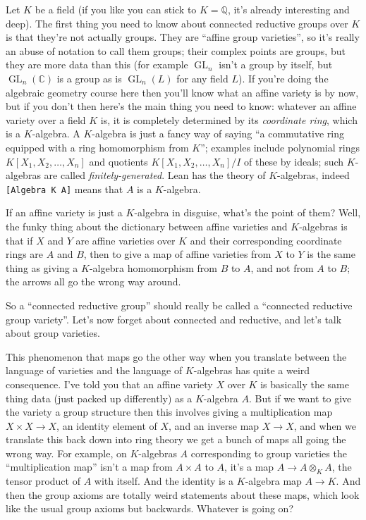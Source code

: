\documentclass{amsart}
\newcommand{\Q}{\mathbb{Q}}
\newcommand{\C}{\mathbb{C}}
\DeclareMathOperator{\GL}{GL}
\begin{document}
Let $K$ be a field (if you like you can stick to $K=\Q$, it's already interesting and deep). The first thing you need to know about connected reductive groups over $K$ is that they're not actually groups. They are ``affine group varieties'', so it's really an abuse of notation to call them groups; their complex points are groups, but they are more data than this (for example $\GL_n$ isn't a group by itself, but $\GL_n(\C)$ is a group as is $\GL_n(L)$ for any field $L$). If you're doing the algebraic geometry course here then you'll know what an affine variety is by now, but if you don't then here's the main thing you need to know: whatever an affine variety over a field $K$ is, it is completely determined by its \emph{coordinate ring}, which is a $K$-algebra. A $K$-algebra is just a fancy way of saying ``a commutative ring equipped with a ring homomorphism from $K$''; examples include polynomial rings $K[X_1,X_2,\ldots,X_n]$ and quotients $K[X_1,X_2,\ldots,X_n]/I$ of these by ideals; such $K$-algebras are called \emph{finitely-generated}. Lean has the theory of $K$-algebras, indeed {\tt [Algebra K A]} means that $A$ is a $K$-algebra.

If an affine variety is just a $K$-algebra in disguise, what's the point of them? Well, the funky thing about the dictionary between affine varieties and $K$-algebras is that if $X$ and $Y$ are affine varieties over $K$ and their corresponding coordinate rings are $A$ and $B$, then to give a map of affine varieties from $X$ to $Y$ is the same thing as giving a $K$-algebra homomorphism from $B$ to $A$, and not from $A$ to $B$; the arrows all go the wrong way around.

So a ``connected reductive group'' should really be called a ``connected reductive group variety''. Let's now forget about connected and reductive, and let's talk about group varieties.

This phenomenon that maps go the other way when you translate between the language of varieties and the language of $K$-algebras has quite a weird consequence. I've told you that an affine variety $X$ over $K$ is basically the same thing data (just packed up differently) as a $K$-algebra $A$. But if we want to give the variety a group structure then this involves giving a multiplication map $X\times X\to X$, an identity element of $X$, and an inverse map $X\to X$, and when we translate this back down into ring theory we get a bunch of maps all going the wrong way. For example, on $K$-algebras $A$ corresponding to group varieties the ``multiplication map'' isn't a map from $A\times A$ to $A$, it's a map $A\to A\otimes_KA$, the tensor product of $A$ with itself. And the identity is a $K$-algebra map $A\to K$. And then the group axioms are totally weird statements about these maps, which look like the usual group axioms but backwards. Whatever is going on?
\end{document}
